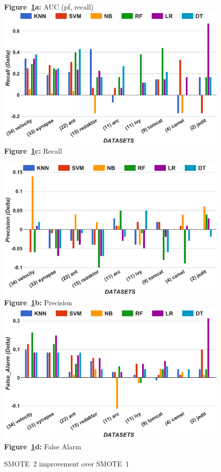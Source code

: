 \begin{figure}[!t]
\begin{minipage}{.5\linewidth}
  {\bf Figure~\ref{fig:tuned}a:} AUC (pf, recall)
        \includegraphics[width=\linewidth]{./fig/Recall_tuned.png}
  {\bf Figure~\ref{fig:tuned}c:} Recall
    \end{minipage}%
\begin{minipage}{.5\linewidth}
        \centering
        \includegraphics[width=\linewidth]{./fig/prec_tuned.png}
  {\bf Figure~\ref{fig:tuned}b:} Precision
        \includegraphics[width=\linewidth]{./fig/pf_tuned.png}
  {\bf Figure~\ref{fig:tuned}d:} False Alarm
    \end{minipage}%
    \caption{SMOTE~2 improvement over SMOTE~1}
    \label{fig:tuned}
\end{figure}

